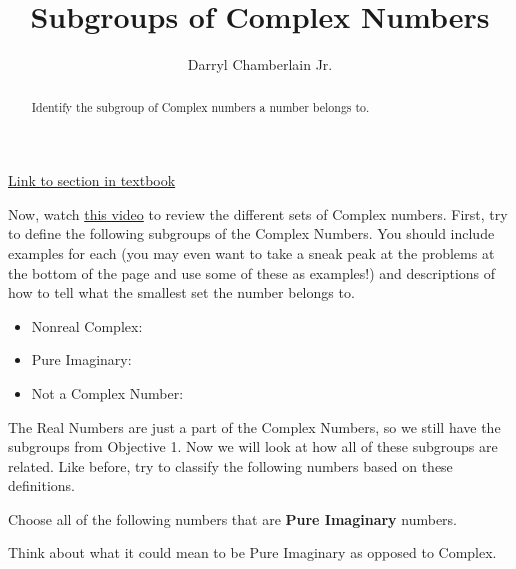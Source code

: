 \documentclass{ximera}
\author{Darryl Chamberlain Jr.}
\title{Subgroups of Complex Numbers}
\begin{document}
\begin{abstract}
Identify the subgroup of Complex numbers a number belongs to.
\end{abstract}
\maketitle

\href{https://cnx.org/contents/mwjClAV_@8.1:Sqk1HAGf@9/Complex-Numbers}{Link to section in textbook}


Now, watch \href{https://mediasite.video.ufl.edu/Mediasite/Play/8fae3825474042a297038c5d2385c4f51d}{this video} to review the different sets of Complex numbers. First, try to define the following subgroups of the Complex Numbers. You should include examples for each (you may even want to take a sneak peak at the problems at the bottom of the page and use some of these as examples!) and descriptions of how to tell what the smallest set the number belongs to.

\begin{itemize}
\item Nonreal Complex:
\item Pure Imaginary:
\item Not a Complex Number:
\end{itemize}

The Real Numbers are just a part of the Complex Numbers, so we still have the subgroups from Objective 1. Now we will look at how all of these subgroups are related. Like before, try to classify the following numbers based on these definitions.

\begin{exercise}
Choose all of the following numbers that are \textbf{Pure Imaginary} numbers.

\begin{selectAll}
\end{selectAll}

\begin{hint}
Think about what it could mean to be Pure Imaginary as opposed to Complex.
\end{hint}

\end{exercise}
\end{document}
